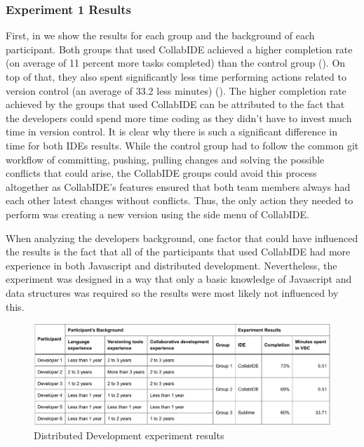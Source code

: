 \subsubsection{Experiment 1 Results}

First, in  we show the results for each group and the background of each participant. Both groups that used CollabIDE achieved a higher completion rate (on average of 11 percent more tasks completed) than the control group (). On top of that, they also spent significantly less time performing actions related to version control (an average of 33.2 less minutes) (). The higher completion rate achieved by the groups that used CollabIDE can be attributed to the fact that the developers could spend more time coding as they didn’t have to invest much time in version control. It is clear why there is such a significant difference in time for both IDEs results. While the control group had to follow the common git workflow of committing, pushing, pulling changes and solving the possible conflicts that could arise, the CollabIDE groups could avoid this process altogether as CollabIDE’s features ensured that both team members always had each other latest changes without conflicts. Thus, the only action they needed to perform was creating a new version using the side menu of CollabIDE.


When analyzing the developers background, one factor that could have influenced the results is the fact that all of the participants that used CollabIDE had more experience in both Javascript and distributed development. Nevertheless, the experiment was designed in a way that only a basic knowledge of Javascript and data structures was required so the results were most likely not influenced by this.

\begin{figure}[htbp]
  \centering
  \includegraphics[width=1\textwidth]{img/resultsTableCollaborative}
  \caption{Distributed Development experiment results}
  \label{fig:resultsTableCollaborative}
\end{figure}


